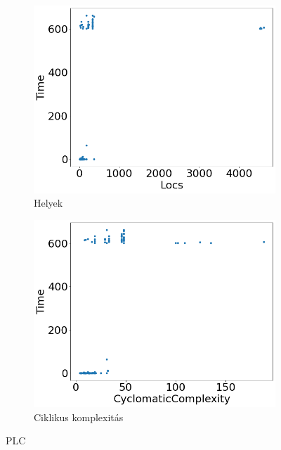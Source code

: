 \begin{figure}[ht]
\begin{subfigure}[b]{0.5\linewidth}
		\includegraphics[width=0.95\linewidth]{figures/plc/locs.png} 
		\caption{Helyek} 
		\label{fig7:c} 
	\end{subfigure}%
	\begin{subfigure}[b]{0.5\linewidth}
		\centering
		\includegraphics[width=0.95\linewidth]{figures/plc/cc.png} 
		\caption{Ciklikus komplexitás} 
		\label{fig7:d} 
	\end{subfigure} 
	\caption{PLC}
	\label{fig_plc} 
\end{figure}

